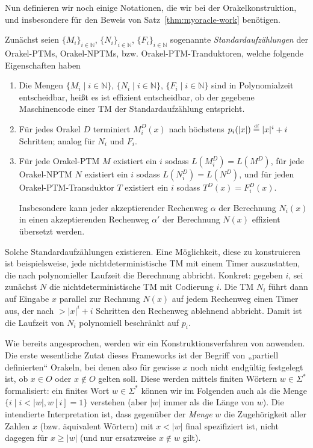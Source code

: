 Nun definieren wir noch einige Notationen, die wir bei der Orakelkonstruktion, und insbesondere für den Beweis von Satz~\ref{thm:myoracle-work} benötigen.

Zunächst seien $\{M_i\}_{i\in \mathbb N}$, $\{N_i\}_{i\in \mathbb N}$, $\{F_i\}_{i\in\mathbb N}$ sogenannte \emph{Standardaufzählungen} der Orakel-PTMs, Orakel-NPTMs, bzw. Orakel-PTM-Tranduktoren, welche folgende Eigenschaften haben
\begin{enumerate}[label=\arabic*.]
    \item Die Mengen $\{M_i \mid i\in\mathbb N\}$, $\{N_i \mid i\in\mathbb N\}$, $\{F_i \mid i\in\mathbb N\}$ sind in Polynomialzeit entscheidbar, heißt es ist effizient entscheidbar, ob der gegebene Maschinencode einer TM der Standardaufzählung entspricht.
    \item Für jedes Orakel $D$ terminiert $M_i^D(x)$ nach höchstens $p_i(|x|)\stackrel{\text{\smash{\tiny df}}}{=} |x|^i+i$ Schritten; analog für $N_i$ und $F_i$.
    \item Für jede Orakel-PTM $M$ existiert ein $i$ sodass $L(M^D_i)=L(M^D)$, 
        für jede Orakel-NPTM $N$ existiert ein $i$ sodass $L(N^D_i)=L(N^D)$, und
        für jeden Orakel-PTM-Transduktor $T$ existiert ein $i$ sodass $T^D(x)=F_i^D(x)$.

        Insbesondere kann jeder akzeptierender Rechenweg $\alpha$ der Berechnung $N_i(x)$ in einen akzeptierenden Rechenweg $\alpha'$ der Berechnung $N(x)$ effizient übersetzt werden.
\end{enumerate}
Solche Standardaufzählungen existieren. Eine Möglichkeit, diese zu konstruieren ist beispielsweise, jede nichtdeterministische TM mit einem Timer auszustatten, die nach polynomieller Laufzeit die Berechnung abbricht. Konkret: gegeben $i$, sei zunächst $N$ die nichtdeterministische TM mit Codierung $i$. Die TM $N_i$ führt dann auf Eingabe $x$ parallel zur Rechnung $N(x)$ auf jedem Rechenweg einen Timer aus, der nach $>|x|^i+i$ Schritten den Rechenweg ablehnend abbricht.
Damit ist die Laufzeit von $N_i$ polynomiell beschränkt auf $p_i$.

Wie bereits angesprochen, werden wir ein Konstruktionsverfahren von \citeauthor{dose_np-completeness_2019} anwenden. Die erste wesentliche Zutat dieses Frameworks ist der Begriff von „partiell definierten“ Orakeln, bei denen also für gewisse $x$ noch nicht endgültig festgelegt ist, ob $x\in O$ oder $x\not\in O$ gelten soll.
Diese werden mittels finiten Wörtern $w\in\Sigma^*$ formalisiert:
ein finites Wort $w\in\Sigma^*$ können wir im Folgenden auch als die Menge $\{ i \mid i<|w|, w[i] = 1 \}$ verstehen (aber $|w|$ immer als die Länge von $w$).
Die intendierte Interpretation ist, dass gegenüber der \emph{Menge} $w$ die Zugehörigkeit aller Zahlen $x$ (bzw. äquivalent Wörtern) mit $x<|w|$ final spezifiziert ist, nicht dagegen für $x\geq|w|$ (und nur ersatzweise $x\not\in w$ gilt).

